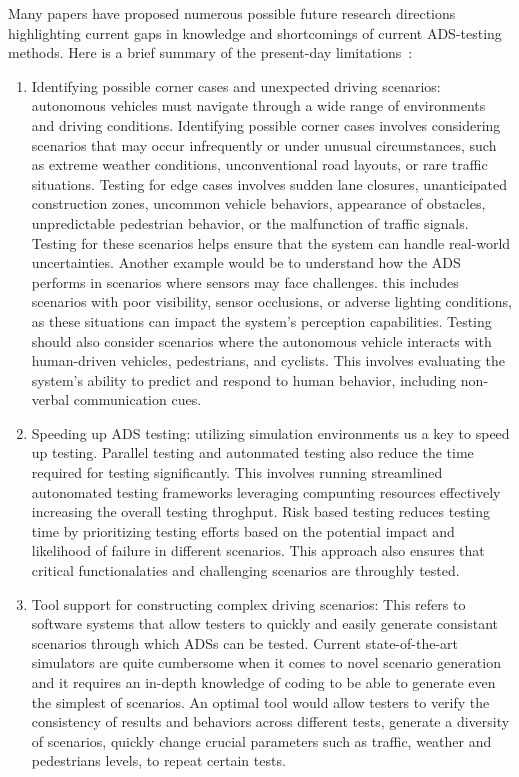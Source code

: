 \documentclass[a4paper]{article}
\begin{document}
\vspace{.5cm}
\noindent
Many papers have proposed numerous possible future research directions highlighting current gaps in knowledge and shortcomings of current ADS-testing methods. Here is a brief summary of the present-day limitations~\cite{lou2022testing}:
\begin{enumerate}
  \item Identifying possible corner cases and unexpected driving scenarios: autonomous vehicles must navigate through a wide range of environments and driving conditions. Identifying possible corner cases involves considering scenarios that may occur infrequently or under unusual circumstances, such as extreme weather conditions, unconventional road layouts, or rare traffic situations. Testing for edge cases involves sudden lane closures, unanticipated construction zones, uncommon vehicle behaviors, appearance of obstacles, unpredictable pedestrian behavior, or the malfunction of traffic signals. Testing for these scenarios helps ensure that the system can handle real-world uncertainties. Another example would be to understand how the ADS performs in scenarios where sensors may face challenges. this includes scenarios with poor visibility, sensor occlusions, or adverse lighting conditions, as these situations can impact the system's perception capabilities. Testing should also consider scenarios where the autonomous vehicle interacts with human-driven vehicles, pedestrians, and cyclists. This involves evaluating the system's ability to predict and respond to human behavior, including non-verbal communication cues.
  \item Speeding up ADS testing: utilizing simulation environments us a key to speed up testing. Parallel testing and autonmated testing also reduce the time required for testing significantly. This involves running streamlined autonomated testing frameworks leveraging compunting resources effectively increasing the overall testing throghput. Risk based testing reduces testing time by prioritizing testing efforts based on the potential impact and likelihood of failure in different scenarios. This approach also ensures that critical functionalaties and challenging scenarios are throughly tested.
  \item Tool support for constructing complex driving scenarios: This refers to software systems that allow testers to quickly and easily generate consistant scenarios through which ADSs can be tested. Current state-of-the-art simulators are quite cumbersome when it comes to novel scenario generation and it requires an in-depth knowledge of coding to be able to generate even the simplest of scenarios. An optimal tool would allow testers to verify the consistency of results and behaviors across different tests, generate a diversity of scenarios, quickly change crucial parameters such as traffic, weather and pedestrians levels, to repeat certain tests.

\end{enumerate}
\end{document}
